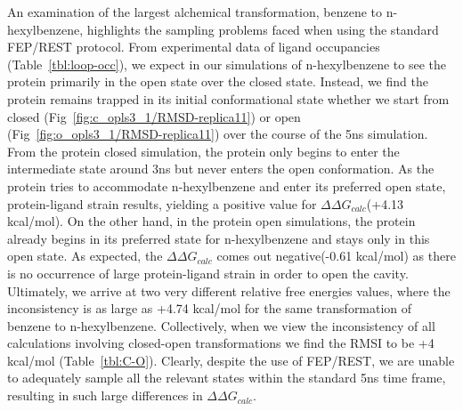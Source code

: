 \documentclass[journal=jctcce,manuscript=article]{achemso}
\begin{document}
An examination of the largest alchemical transformation, benzene to n-hexylbenzene, highlights the sampling problems faced when using the standard FEP/REST protocol.
From experimental data of ligand occupancies (Table~\ref{tbl:loop-occ}), we expect in our simulations of n-hexylbenzene to see the protein primarily in the open state over the closed state.
Instead, we find the protein remains trapped in its initial conformational state whether we start from closed (Fig~\ref{fig:c_opls3_1/RMSD-replica11}) or open (Fig~\ref{fig:o_opls3_1/RMSD-replica11}) over the course of the 5ns simulation.
From the protein closed simulation, the protein only begins to enter the intermediate state around 3ns but never enters the open conformation.
As the protein tries to accommodate n-hexylbenzene and enter its preferred open state, protein-ligand strain results, yielding a positive value for $\Delta\Delta G_{calc}$(+4.13 kcal/mol).
On the other hand, in the protein open simulations, the protein already begins in its preferred state for n-hexylbenzene and stays only in this open state.
As expected, the $\Delta\Delta G_{calc}$ comes out negative(-0.61 kcal/mol) as there is no occurrence of large protein-ligand strain in order to open the cavity.
Ultimately, we arrive at two very different relative free energies values, where the inconsistency is as large as +4.74 kcal/mol for the same transformation of benzene to n-hexylbenzene\footnotemark.
Collectively, when we view the inconsistency of all calculations involving closed-open transformations we find the RMSI to be +4 kcal/mol (Table~\ref{tbl:C-O}).  
Clearly, despite the use of FEP/REST, we are unable to adequately sample all the relevant states within the standard 5ns time frame, resulting in such large differences in $\Delta\Delta G_{calc}$.

\end{document}
